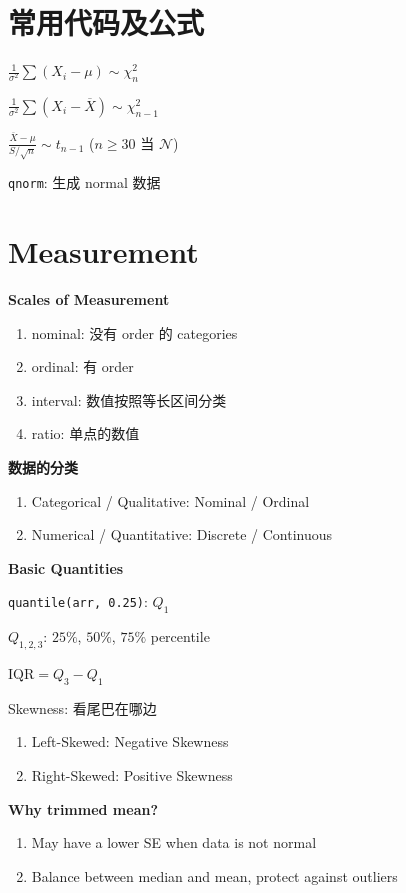 \documentclass[9pt,landscape]{article}
\begin{document}
\begin{multicols}{3}

\columnseprule=0.25pt

\section{常用代码及公式}

$\frac{1}{\sigma^2}\sum(X_i-\mu)\sim\chi^2_n$

$\frac{1}{\sigma^2}\sum(X_i-\overline{X})\sim\chi^2_{n-1}$

$\frac{\overline{X}-\mu}{S/\sqrt{n}}\sim t_{n-1}$ ($n\ge 30$ 当 $\mathcal{N}$)

\texttt{qnorm}: 生成 normal 数据

\section{Measurement}

\textbf{Scales of Measurement}

\begin{enumerate}
	\item nominal: 没有 order 的 categories
	\item ordinal: 有 order
	\item interval: 数值按照等长区间分类
	\item ratio: 单点的数值
\end{enumerate}

\textbf{数据的分类}
\begin{enumerate}
	\item Categorical / Qualitative: Nominal / Ordinal
	\item Numerical / Quantitative: Discrete / Continuous
\end{enumerate}

\textbf{Basic Quantities}

\texttt{quantile(arr, 0.25)}: $Q_1$

$Q_{1, 2, 3}$: $25\%$, $50\%$, $75\%$ percentile

$\mathrm{IQR}=Q_3-Q_1$

Skewness: 看尾巴在哪边
\begin{enumerate}
	\item Left-Skewed: Negative Skewness
	\item Right-Skewed: Positive Skewness
\end{enumerate}

\textbf{Why trimmed mean?}
\begin{enumerate}
	\item May have a lower SE when data is not normal
	\item Balance between median and mean, protect against outliers
\end{enumerate}


\end{multicols}
\end{document}
